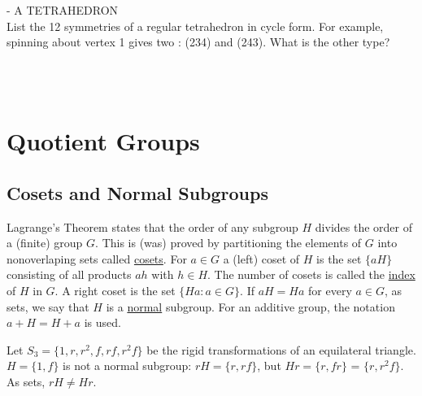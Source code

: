 \documentclass[12pt]{book}
\theoremstyle{definition}
\begin{document}
 - A TETRAHEDRON \\[.2in] 
List the 12 symmetries of a regular tetrahedron in cycle form. For example, spinning about vertex 1 gives two : (234) and (243). What is the other type? 

~\\
~\\
\begin{figure}[h!]
	\centering
	
\end{figure}

\section{Quotient Groups}

\subsection{Cosets and Normal Subgroups}

Lagrange's Theorem states that the order of any subgroup $H$ divides the order of a (finite) group $G$. This is (was) proved by partitioning the elements of $G$
into nonoverlaping sets called \underline {cosets}. For $a\in G$ a (left) coset of $H$ is the set $\{aH\}$ consisting of all products $ah$ with $h\in H$. The number of cosets is called the \underline{index} of $H$ in $G$. A right coset is the set $\{Ha: a\in G\}$. If $aH = Ha$ for every $a\in G$, as sets, we say that $H$ is a \underline{normal} subgroup.  For an additive group, the notation $a+H = H+a$ is used.

\begin{tcexample}{}{}
Let $S_3 =\{1, r, r^2, f, rf, r^2f\}$ be the rigid transformations of an equilateral triangle. $H = \{1, f\}$ is not a normal subgroup: $rH = \{r, rf\}$, but $Hr = \{r, fr\}$ = $\{r, r^2f\}$. As sets, $rH \neq Hr$.
\end{tcexample}
\end{document}
